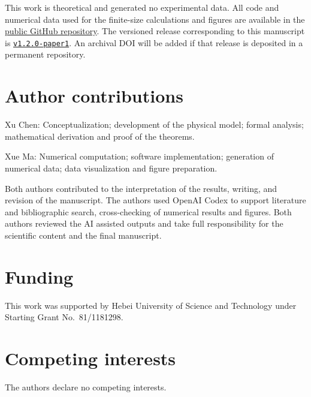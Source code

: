 This work is theoretical and generated no experimental data. All code and
numerical data used for the finite-size calculations and figures are available
in the
\href{https://github.com/chenxu8817-cyber/quantum-change-intervals}{public
GitHub repository}. The versioned release corresponding to this manuscript is
\href{https://github.com/chenxu8817-cyber/quantum-change-intervals/releases/tag/v1.2.0-paper1}{\texttt{v1.2.0-paper1}}.
An archival DOI will be added if that release is deposited in a permanent
repository.

\section*{Author contributions}

Xu Chen: Conceptualization; development of the physical model; formal
analysis; mathematical derivation and proof of the theorems.

Xue Ma: Numerical computation; software implementation; generation of
numerical data; data visualization and figure preparation.

Both authors contributed to the interpretation of
the results, writing, and revision of the manuscript.
The authors used OpenAI Codex to support literature
and bibliographic search, cross-checking of numerical
results and figures. Both authors reviewed the AI
assisted outputs and take full responsibility for the
scientific content and the final manuscript.

\section*{Funding}

This work was supported by Hebei University of Science and Technology under
Starting Grant No.~81/1181298.

\section*{Competing interests}

The authors declare no competing interests.


